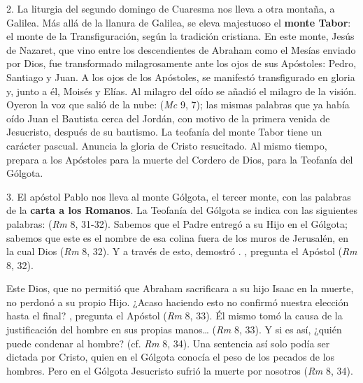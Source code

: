 \begin{body}
2. La liturgia del segundo domingo de Cuaresma nos lleva a otra montaña, a Galilea. Más allá de la llanura de Galilea, se eleva majestuoso el \textbf{monte Tabor}: el monte de la Transfiguración, según la tradición cristiana. En este monte, Jesús de Nazaret, que vino entre los descendientes de Abraham como el Mesías enviado por Dios, fue transformado milagrosamente ante los ojos de sus Apóstoles: Pedro, Santiago y Juan. A los ojos de los Apóstoles, se manifestó transfigurado en gloria y, junto a él, Moisés y Elías. Al milagro del oído se añadió el milagro de la visión. Oyeron la voz que salió de la nube:  (\textit{Mc} 9, 7); las mismas palabras que ya había oído Juan el Bautista cerca del Jordán, con motivo de la primera venida de Jesucristo, después de su bautismo. La teofanía del monte Tabor tiene un carácter pascual. Anuncia la gloria de Cristo resucitado. Al mismo tiempo, prepara a los Apóstoles para la muerte del Cordero de Dios, para la Teofanía del Gólgota.

3. El apóstol Pablo nos lleva al monte Gólgota, el tercer monte, con las palabras de la \textbf{carta a los Romanos}. La Teofanía del Gólgota se indica con las siguientes palabras:  (\textit{Rm} 8, 31-32). Sabemos que el Padre entregó a su Hijo en el Gólgota; sabemos que este es el nombre de esa colina fuera de los muros de Jerusalén, en la cual Dios  (\textit{Rm} 8, 32). Y a través de esto, demostró . , pregunta el Apóstol (\textit{Rm} 8, 32).

Este Dios, que no permitió que Abraham sacrificara a su hijo Isaac en la muerte, no perdonó a su propio Hijo. ¿Acaso haciendo esto no confirmó nuestra elección hasta el final? , pregunta el Apóstol (\textit{Rm} 8, 33). Él mismo tomó la causa de la justificación del hombre en sus propias manos\ldots {} (\textit{Rm} 8, 33). Y si es así, ¿quién puede condenar al hombre? (cf. \textit{Rm} 8, 34). Una sentencia así solo podía ser dictada por Cristo, quien en el Gólgota conocía el peso de los pecados de los hombres. Pero en el Gólgota Jesucristo sufrió la muerte por nosotros  (\textit{Rm} 8, 34).


\end{body}

